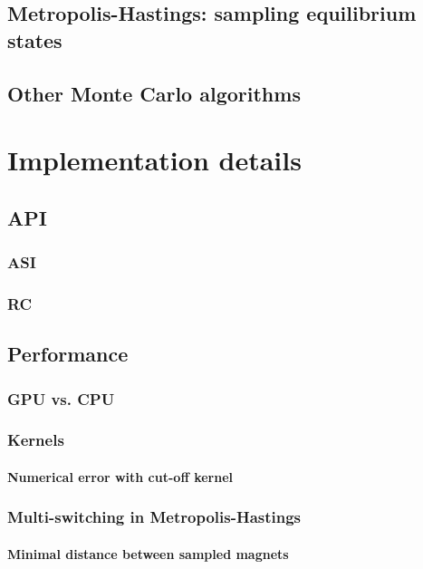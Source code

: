 \subsection{Metropolis-Hastings: sampling equilibrium states}
\subsection{Other Monte Carlo algorithms} %

\section{Implementation details}
\subsection{API} %
\subsubsection{ASI}
\subsubsection{RC}
\subsection{Performance} %
\subsubsection{GPU vs. CPU}
\subsubsection{Kernels} %
\paragraph{Numerical error with cut-off kernel}
\subsubsection{Multi-switching in Metropolis-Hastings}
\paragraph{Minimal distance between sampled magnets} %
